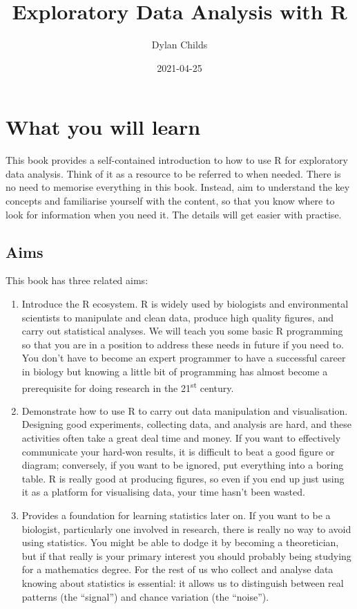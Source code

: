 \documentclass[
]{book}
\title{Exploratory Data Analysis with R}
\author{Dylan Childs}
\date{2021-04-25}
\begin{document}
\maketitle

{
\setcounter{tocdepth}{1}
\tableofcontents
}
\hypertarget{what-you-will-learn}{%
\chapter*{What you will learn}\label{what-you-will-learn}}

This book provides a self-contained introduction to how to use R for exploratory data analysis. Think of it as a resource to be referred to when needed. There is no need to memorise everything in this book. Instead, aim to understand the key concepts and familiarise yourself with the content, so that you know where to look for information when you need it. The details will get easier with practise.

\hypertarget{aims}{%
\section*{Aims}\label{aims}}

This book has three related aims:

\begin{enumerate}
\def\labelenumi{\arabic{enumi}.}
\item
  Introduce the R ecosystem. R is widely used by biologists and environmental scientists to manipulate and clean data, produce high quality figures, and carry out statistical analyses. We will teach you some basic R programming so that you are in a position to address these needs in future if you need to. You don't have to become an expert programmer to have a successful career in biology but knowing a little bit of programming has almost become a prerequisite for doing research in the 21\textsuperscript{st} century.
\item
  Demonstrate how to use R to carry out data manipulation and visualisation. Designing good experiments, collecting data, and analysis are hard, and these activities often take a great deal time and money. If you want to effectively communicate your hard-won results, it is difficult to beat a good figure or diagram; conversely, if you want to be ignored, put everything into a boring table. R is really good at producing figures, so even if you end up just using it as a platform for visualising data, your time hasn't been wasted.
\item
  Provides a foundation for learning statistics later on. If you want to be a biologist, particularly one involved in research, there is really no way to avoid using statistics. You might be able to dodge it by becoming a theoretician, but if that really is your primary interest you should probably being studying for a mathematics degree. For the rest of us who collect and analyse data knowing about statistics is essential: it allows us to distinguish between real patterns (the ``signal'') and chance variation (the ``noise'').
\end{enumerate}
\end{document}
